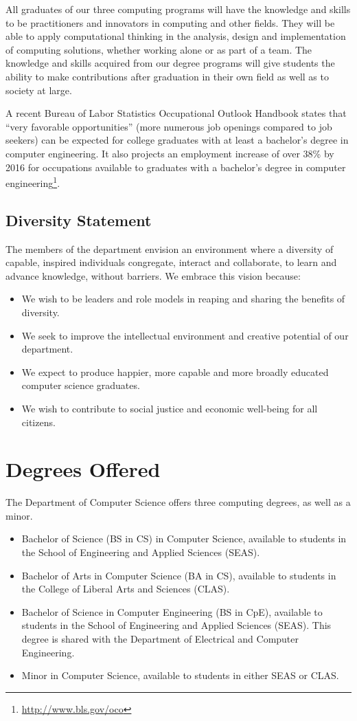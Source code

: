\documentclass[10pt,letter]{book}
\newenvironment{itemlist}{
\begin{itemize}
\setlength{\itemsep}{0pt}
\setlength{\parskip}{0pt}}
{\end{itemize}}
\newcommand{\mysection}[1]{\section{#1}\renewcommand{\rightmark}{#1}}
\newcommand{\myurl}[1]{\footnote{\scriptsize\url{#1}}}
\begin{document}
All graduates of our three computing programs will have the knowledge
and skills to be practitioners and innovators in computing and other
fields.  They will be able to apply computational thinking in the
analysis, design and implementation of computing solutions, whether
working alone or as part of a team. The knowledge and skills acquired
from our degree programs will give students the ability to make
contributions after graduation in their own field as well as to
society at large.

A recent Bureau of Labor Statistics Occupational Outlook Handbook
states that ``very favorable opportunities'' (more numerous job
openings compared to job seekers) can be expected for college
graduates with at least a bachelor's degree in computer
engineering. It also projects an employment increase of over 38\% by
2016 for occupations available to graduates with a bachelor's degree
in computer engineering\myurl{http://www.bls.gov/oco}.

\subsection{Diversity Statement}

The members of the department envision an environment where a
diversity of capable, inspired individuals congregate, interact and
collaborate, to learn and advance knowledge, without barriers. We
embrace this vision because:

\begin{itemlist}
\item We wish to be leaders and role models in reaping and sharing the
 benefits of diversity.
\item We seek to improve the intellectual environment and creative
 potential of our department.
\item We expect to produce happier, more capable and more broadly
 educated computer science graduates.
\item We wish to contribute to social justice and economic well-being
 for all citizens.
\end{itemlist}

\mysection{Degrees Offered}

The Department of Computer Science offers three computing degrees, as well as a minor.

\begin{itemlist}
\item Bachelor of Science (BS in CS) in Computer Science, available to
  students in the School of Engineering and Applied Sciences (SEAS).
\item Bachelor of Arts in Computer Science (BA in CS), available to
  students in the College of Liberal Arts and Sciences (CLAS).
\item Bachelor of Science in Computer Engineering (BS in CpE),
  available to students in the School of Engineering and Applied
  Sciences (SEAS). This degree is shared with the Department of
  Electrical and Computer Engineering.
\item Minor in Computer Science, available to students in either SEAS
  or CLAS.
\end{itemlist}
\end{document}
